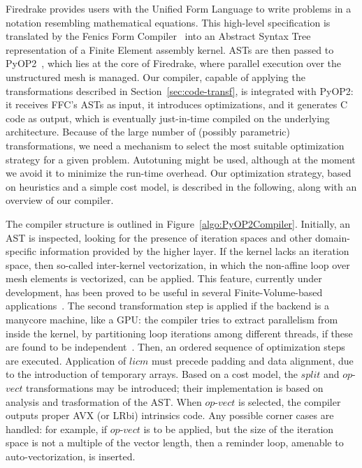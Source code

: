 \documentclass[conference]{IEEEtran}
\begin{document}
Firedrake provides users with the Unified Form Language to write problems in a notation resembling mathematical equations. This high-level specification is translated by the Fenics Form Compiler~\cite{ffc} into an Abstract Syntax Tree representation of a Finite Element assembly kernel. ASTs are then passed to PyOP2~\cite{pyop2isc}, which lies at the core of Firedrake, where parallel execution over the unstructured mesh is managed. Our compiler, capable of applying the transformations described in Section~\ref{sec:code-transf}, is integrated with PyOP2: it receives FFC's ASTs as input, it introduces optimizations, and it generates C code as output, which is eventually just-in-time compiled on the underlying architecture. Because of the large number of (possibly parametric) transformations, we need a mechanism to select the most suitable optimization strategy for a given problem. Autotuning might be used, although at the moment we avoid it to minimize the run-time overhead. Our optimization strategy, based on heuristics and a simple cost model, is described in the following, along with an overview of our compiler.

The compiler structure is outlined in Figure~\ref{algo:PyOP2Compiler}. Initially, an AST is inspected, looking for the presence of iteration spaces and other domain-specific information provided by the higher layer. If the kernel lacks an iteration space, then so-called inter-kernel vectorization, in which the non-affine loop over mesh elements is vectorized, can be applied. This feature, currently under development, has been proved to be useful in several Finite-Volume-based applications~\cite{reguly-inter-kernel}. The second transformation step is applied if the backend is a manycore machine, like a GPU: the compiler tries to extract parallelism from inside the kernel, by partitioning loop iterations among different threads, if these are found to be independent~\cite{quadrature-cuda}. Then, an ordered sequence of optimization steps are executed. Application of $licm$ must precede padding and data alignment, due to the introduction of temporary arrays. Based on a cost model, the $split$ and $op$-$vect$ transformations may be introduced; their implementation is based on analysis and trasformation of the AST. When $op$-$vect$ is selected, the compiler outputs proper AVX (or LRbi) intrinsics code. Any possible corner cases are handled: for example, if $op$-$vect$ is to be applied, but the size of the iteration space is not a multiple of the vector length, then a reminder loop, amenable to auto-vectorization, is inserted. 
\end{document}
